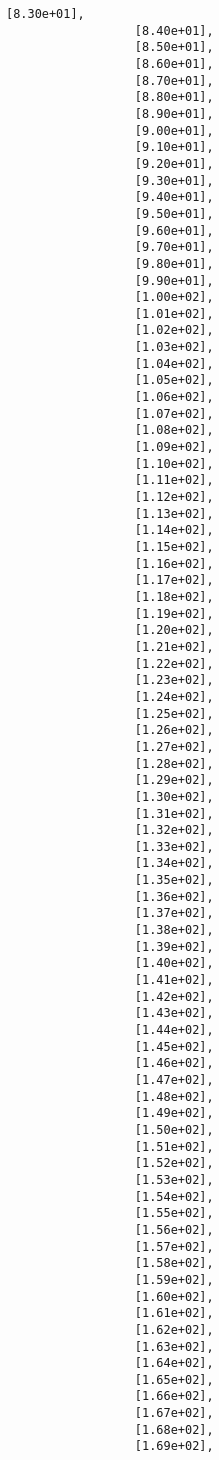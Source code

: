 \documentclass[11pt]{article}
\begin{document}
\begin{Verbatim}[commandchars=\\\{\}]
                  [8.30e+01],
                  [8.40e+01],
                  [8.50e+01],
                  [8.60e+01],
                  [8.70e+01],
                  [8.80e+01],
                  [8.90e+01],
                  [9.00e+01],
                  [9.10e+01],
                  [9.20e+01],
                  [9.30e+01],
                  [9.40e+01],
                  [9.50e+01],
                  [9.60e+01],
                  [9.70e+01],
                  [9.80e+01],
                  [9.90e+01],
                  [1.00e+02],
                  [1.01e+02],
                  [1.02e+02],
                  [1.03e+02],
                  [1.04e+02],
                  [1.05e+02],
                  [1.06e+02],
                  [1.07e+02],
                  [1.08e+02],
                  [1.09e+02],
                  [1.10e+02],
                  [1.11e+02],
                  [1.12e+02],
                  [1.13e+02],
                  [1.14e+02],
                  [1.15e+02],
                  [1.16e+02],
                  [1.17e+02],
                  [1.18e+02],
                  [1.19e+02],
                  [1.20e+02],
                  [1.21e+02],
                  [1.22e+02],
                  [1.23e+02],
                  [1.24e+02],
                  [1.25e+02],
                  [1.26e+02],
                  [1.27e+02],
                  [1.28e+02],
                  [1.29e+02],
                  [1.30e+02],
                  [1.31e+02],
                  [1.32e+02],
                  [1.33e+02],
                  [1.34e+02],
                  [1.35e+02],
                  [1.36e+02],
                  [1.37e+02],
                  [1.38e+02],
                  [1.39e+02],
                  [1.40e+02],
                  [1.41e+02],
                  [1.42e+02],
                  [1.43e+02],
                  [1.44e+02],
                  [1.45e+02],
                  [1.46e+02],
                  [1.47e+02],
                  [1.48e+02],
                  [1.49e+02],
                  [1.50e+02],
                  [1.51e+02],
                  [1.52e+02],
                  [1.53e+02],
                  [1.54e+02],
                  [1.55e+02],
                  [1.56e+02],
                  [1.57e+02],
                  [1.58e+02],
                  [1.59e+02],
                  [1.60e+02],
                  [1.61e+02],
                  [1.62e+02],
                  [1.63e+02],
                  [1.64e+02],
                  [1.65e+02],
                  [1.66e+02],
                  [1.67e+02],
                  [1.68e+02],
                  [1.69e+02],

\end{Verbatim}
\end{document}
